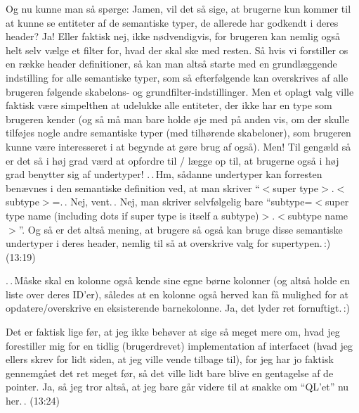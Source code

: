 \documentclass{report}
\begin{document}
Og nu kunne man så spørge: Jamen, vil det så sige, at brugerne kun kommer til at kunne se entiteter af de semantiske typer, de allerede har godkendt i deres header? Ja! Eller faktisk nej, ikke nødvendigvis, for brugeren kan nemlig også helt selv vælge et filter for, hvad der skal ske med resten. Så hvis vi forstiller os en række header definitioner, så kan man altså starte med en grundlæggende indstilling for alle semantiske typer, som så efterfølgende kan overskrives af alle brugeren følgende skabelons- og grundfilter-indstillinger. Men et oplagt valg ville faktisk være simpelthen at udelukke alle entiteter, der ikke har en type som brugeren kender (og så må man bare holde øje med på anden vis, om der skulle tilføjes nogle andre semantiske typer (med tilhørende skabeloner), som brugeren kunne være interesseret i at begynde at gøre brug af også). Men! Til gengæld så er det så i høj grad værd at opfordre til / lægge op til, at brugerne også i høj grad benytter sig af undertyper! .\,.\,Hm, sådanne undertyper kan forresten benævnes i den semantiske definition ved, at man skriver ``$<$super type$>$.$<$subtype$>$=.\,. Nej, vent.\,. Nej, man skriver selvfølgelig bare ``subtype=$<$super type name (including dots if super type is itself a subtype)$>$.$<$subtype name$>$''. Og så er det altså mening, at brugere så også kan bruge disse semantiske undertyper i deres header, nemlig til så at overskrive valg for supertypen.\,:) (13:19)

.\,.\,Måske skal en kolonne også kende sine egne børne kolonner (og altså holde en liste over deres ID'er), således at en kolonne også herved kan få mulighed for at opdatere/overskrive en eksisterende barnekolonne. Ja, det lyder ret fornuftigt.\,:) 

Det er faktisk lige før, at jeg ikke behøver at sige så meget mere om, hvad jeg forestiller mig for en tidlig (brugerdrevet) implementation af interfacet (hvad jeg ellers skrev for lidt siden, at jeg ville vende tilbage til), for jeg har jo faktisk gennemgået det ret meget før, så det ville lidt bare blive en gentagelse af de pointer. Ja, så jeg tror altså, at jeg bare går videre til at snakke om ``QL'et'' nu her.\,. (13:24)
\end{document}
